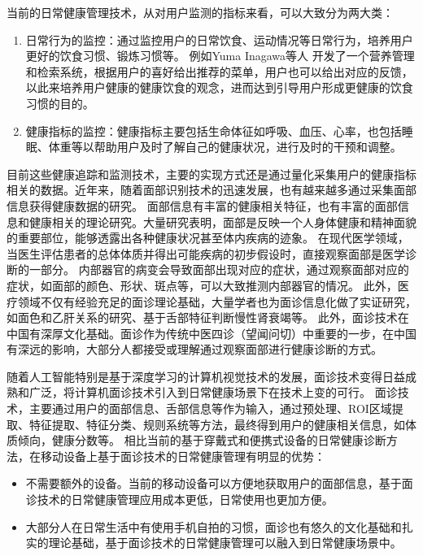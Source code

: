 当前的日常健康管理技术，从对用户监测的指标来看，可以大致分为两大类：

\begin{enumerate}
    \item 日常行为的监控：通过监控用户的日常饮食、运动情况等日常行为，培养用户更好的饮食习惯、锻炼习惯等\cite{purpura2011fit4life,Inagawa2013A,cordeiro2015barriers, miller2014stepstream}。 例如Yuma Inagawa等人\cite{Inagawa2013A} 开发了一个营养管理和检索系统，根据用户的喜好给出推荐的菜单，用户也可以给出对应的反馈，以此来培养用户健康的健康饮食的观念，进而达到引导用户形成更健康的饮食习惯的目的。
    \item 健康指标的监控：健康指标主要包括生命体征如呼吸、血压、心率，也包括睡眠、体重等\cite{kay2012lullaby,gronvall2013beyond,walters2010a}以帮助用户及时了解自己的健康状况，进行及时的干预和调整。
\end{enumerate}

目前这些健康追踪和监测技术，主要的实现方式还是通过量化采集用户的健康指标相关的数据。近年来，随着面部识别技术的迅速发展，也有越来越多通过采集面部信息获得健康数据的研究。
面部信息有丰富的健康相关特征，也有丰富的面部信息和健康相关的理论研究。大量研究表明，面部是反映一个人身体健康和精神面貌的重要部位，能够透露出各种健康状况甚至体内疾病的迹象。
在现代医学领域，当医生评估患者的总体体质并得出可能疾病的初步假设时，直接观察面部是医学诊断的一部分\cite{ding2019reading}。
内部器官的病变会导致面部出现对应的症状，通过观察面部对应的症状，如面部的颜色、形状、斑点等，可以大致推测内部器官的情况\cite{汪珺2018六经辨证中自然辩证法三大规律初探}。
此外，医疗领域不仅有经验充足的面诊理论基础，大量学者也为面诊信息化做了实证研究，如面色和乙肝关系的研究\cite{吴秀艳2014108}、基于舌部特征判断慢性肾衰竭\cite{周小芳2018慢性肾衰患者虚兼湿浊证的口唇特征研究}等。
此外，面诊技术在中国有深厚文化基础。面诊作为传统中医四诊（望闻问切）中重要的一步，在中国有深远的影响，大部分人都接受或理解通过观察面部进行健康诊断的方式。


随着人工智能特别是基于深度学习的计算机视觉技术的发展，面诊技术变得日益成熟和广泛，将计算机面诊技术引入到日常健康场景下在技术上变的可行。
面诊技术，主要通过用户的面部信息、舌部信息等作为输入，通过预处理、ROI区域提取、特征提取、特征分类、规则系统等方法，最终得到用户的健康相关信息，如体质倾向，健康分数等\cite{林锋2019中医面诊系统调研报告}。
相比当前的基于穿戴式和便携式设备的日常健康诊断方法，在移动设备上基于面诊技术的日常健康管理有明显的优势：

\begin{itemize}
    \item 不需要额外的设备。当前的移动设备可以方便地获取用户的面部信息，基于面诊技术的日常健康管理应用成本更低，日常使用也更加方便。
    \item 大部分人在日常生活中有使用手机自拍的习惯，面诊也有悠久的文化基础和扎实的理论基础，基于面诊技术的日常健康管理可以融入到日常健康场景中。
\end{itemize}


